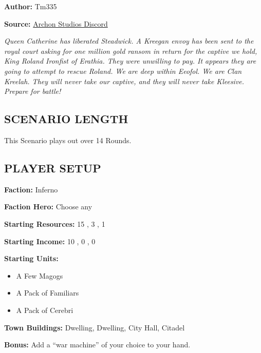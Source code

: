
\begin{multicols*}{2}

\textbf{Author:} Tm335

\textbf{Source:} \href{https://discord.com/channels/740870068178649108/1253923753981902939/1253923753981902939}{Archon Studios Discord}

\textit{Queen Catherine has liberated Steadwick.
A Kreegan envoy has been sent to the royal court asking for one million gold ransom in return for the captive we hold, King Roland Ironfist of Erathia.
They were unwilling to pay.
It appears they are going to attempt to rescue Roland.
We are deep within Eeofol.
We are Clan Kreelah.
They will never take our captive, and they will never take Kleesive.
Prepare for battle!}

\subsection*{\MakeUppercase{Scenario Length}}

This Scenario plays out over 14 Rounds.

\subsection*{\MakeUppercase{Player Setup}}

\textbf{Faction:} Inferno

\textbf{Faction Hero:} Choose any

\textbf{Starting Resources:} 15 , 3 , 1 

\textbf{Starting Income:} 10 , 0 , 0 

\textbf{Starting Units:}

\begin{itemize}
  \item A Few Magogs
  \item A Pack of Familiars
  \item A Pack of Cerebri
\end{itemize}

\textbf{Town Buildings:}  Dwelling,  Dwelling, City Hall, Citadel

\textbf{Bonus:} Add a ``war machine'' of your choice to your hand.


\end{multicols*}

